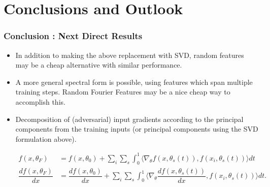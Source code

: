\section{Conclusions and Outlook}
\label{Chapter5} %
\begin{frame}
  \frametitle{Conclusion : Next Direct Results}
  \begin{itemize}
    \item In addition to making the above replacement with SVD, random
      features may be a cheap alternative with similar performance.
    \item A more general spectral form is possible, using features
      which span multiple training steps. Random Fourier Features may
      be a nice cheap way to accomplish this.
    \item Decomposition of (adversarial) input gradients according to
      the principal components from the training inputs (or principal
      components using the SVD formulation above).

\begin{align}
  f(x, \theta_F) &= f(x, \theta_0) + \sum_i \sum_s \int_0^1 \langle
  \nabla_\theta f(x, \theta_s(t)), f(x_i, \theta_s(t))\rangle dt \\
  \dfrac{d f(x, \theta_F)}{dx} &= \dfrac{d f(x, \theta_0)}{dx} + \sum_i \sum_s \int_0^1 \langle
  \nabla_\theta \dfrac{d f(x, \theta_s(t))}{dx}, f(x_i,
                                 \theta_s(t))\rangle dt.
\end{align}
  \end{itemize}    
\end{frame}
